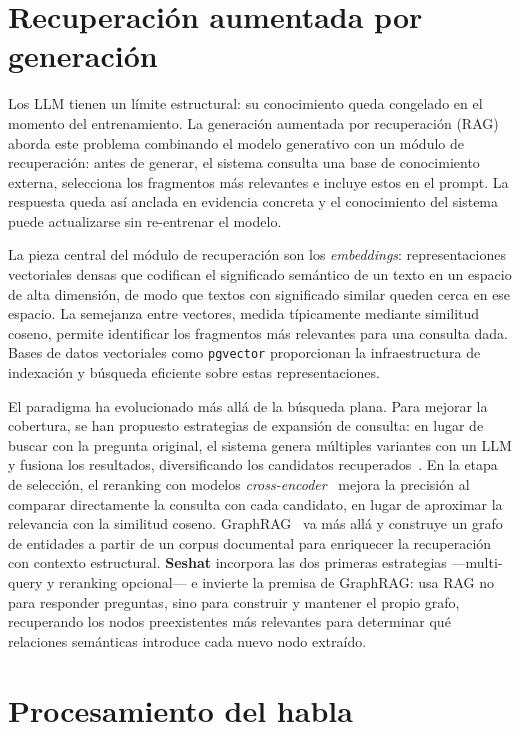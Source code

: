 \section{Recuperación aumentada por generación}

Los \ac{LLM} tienen un límite estructural: su conocimiento queda congelado en el momento del
entrenamiento. La generación aumentada por recuperación (\ac{RAG})~\cite{lewis2020rag} aborda
este problema combinando el modelo generativo con un módulo de recuperación: antes de generar,
el sistema consulta una base de conocimiento externa, selecciona los fragmentos más relevantes e
incluye estos en el prompt. La respuesta queda así anclada en evidencia concreta y el
conocimiento del sistema puede actualizarse sin re-entrenar el modelo.

La pieza central del módulo de recuperación son los \textit{embeddings}: representaciones
vectoriales densas que codifican el significado semántico de un texto en un espacio de alta
dimensión, de modo que textos con significado similar queden cerca en ese espacio. La semejanza
entre vectores, medida típicamente mediante similitud coseno, permite identificar los fragmentos
más relevantes para una consulta dada. Bases de datos vectoriales como \texttt{pgvector}
proporcionan la infraestructura de indexación y búsqueda eficiente sobre estas representaciones.

El paradigma ha evolucionado más allá de la búsqueda plana. Para mejorar la cobertura, se han
propuesto estrategias de expansión de consulta: en lugar de buscar con la pregunta original,
el sistema genera múltiples variantes con un LLM y fusiona los resultados, diversificando los
candidatos recuperados~\cite{gao2024ragsurvey}. En la etapa de selección, el reranking con
modelos \textit{cross-encoder}~\cite{nogueira2020reranking} mejora la precisión al comparar
directamente la consulta con cada candidato, en lugar de aproximar la relevancia con la similitud
coseno. GraphRAG~\cite{edge2025graphrag} va más allá y construye un grafo de entidades a partir
de un corpus documental para enriquecer la recuperación con contexto estructural. \textbf{Seshat}
incorpora las dos primeras estrategias —multi-query y reranking opcional— e invierte la premisa
de GraphRAG: usa \ac{RAG} no para responder preguntas, sino para construir y mantener el propio
grafo, recuperando los nodos preexistentes más relevantes para determinar qué relaciones semánticas
introduce cada nuevo nodo extraído.

\section{Procesamiento del habla}


